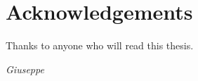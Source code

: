 \chapter*{Acknowledgements}

Thanks to anyone who will read this thesis.\\

\begin{flushright}
    \textit{Giuseppe}
\end{flushright}
